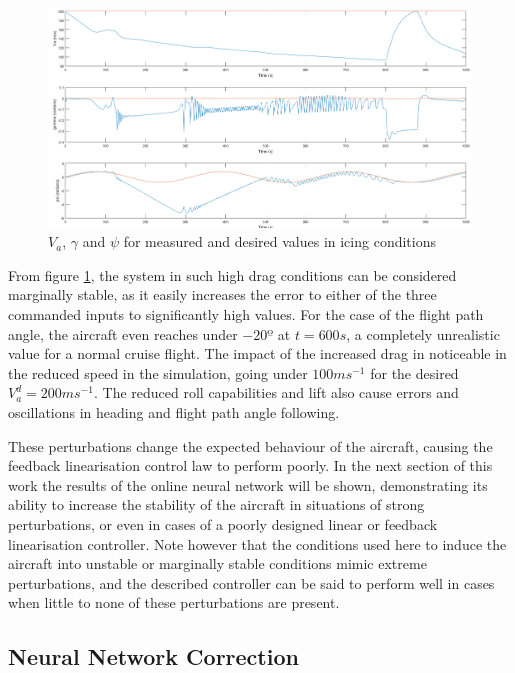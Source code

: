 \begin{figure}[H]
\centering
\includegraphics[width=1.1\textwidth]{Figures/Results/ref_icing.PNG}
\caption[Reference following in icing conditions]{$V_a$, $\gamma$ and $\psi$ for measured and desired values in icing conditions}
\label{fig:ref_icing}
\end{figure}

From figure \ref{fig:ref_icing}, the system in such high drag conditions can be considered marginally stable, as it easily increases the error to either of the three commanded inputs to significantly high values. For the case of the flight path angle, the aircraft even reaches under $-20º$ at $t=600s$, a completely unrealistic value for a normal cruise flight. The impact of the increased drag in noticeable in the reduced speed in the simulation, going under $100ms^{-1}$ for the desired $V_a^d=200ms^{-1}$. The reduced roll capabilities and lift also cause errors and oscillations in heading and flight path angle following.


These perturbations change the expected behaviour of the aircraft, causing the feedback linearisation control law to perform poorly. In the next section of this work the results of the online neural network will be shown, demonstrating its ability to increase the stability of the aircraft in situations of strong perturbations, or even in cases of a poorly designed linear or feedback linearisation controller. Note however that the conditions used here to induce the aircraft into unstable or marginally stable conditions mimic extreme perturbations, and the described controller can be said to perform well in cases when little to none of these perturbations are present.

\subsection{Neural Network Correction}

